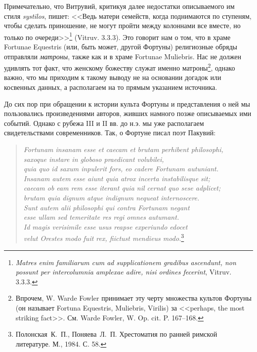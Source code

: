 
Примечательно, что Витрувий, критикуя далее недостатки описываемого им стиля \textit{systilos}, пишет: <<Ведь матери семейств, когда поднимаются по ступеням, чтобы сделать приношение, не могут пройти между колоннами все вместе, но только по очереди>>\footnote{\textit{Matres enim familiarum cum ad supplicationem gradibus ascendunt, non possunt per intercolumnia amplexae adire, nisi ordines fecerint}, Vitruv. 3.3.3.} (Vitruv. 3.3.3). Это говорит нам о том, что в храме Fortunae Equestris (или, быть может, другой Фортуны) религиозные обряды отправляли \textit{матроны}, также как и в храме Fortunae Muliebris. Нас не должен удивлять тот факт, что женскому божеству служат именно матроны\footnote{Впрочем, W. Warde Fowler принимает эту черту множества культов Фортуны (он называет Fortuna Equestris, Muliebris, Virilis) за <<perhaps, the most striking fact>>. См. Warde Fowler, W. Op. cit. P. 167--168.}, однако важно, что мы приходим к такому выводу не на основании догадок или косвенных данных, а располагаем на то прямым указанием источника.


До сих пор при обращении к истории культа Фортуны и представления о ней мы пользовались произведениями авторов, живших намного позже описываемых ими событий. Однако с рубежа III и II вв. до н.э. мы уже располагаем свидетельствами современников. Так, о Фортуне писал поэт Пакувий:

\begin{verse}
\textit{Fortunam insanam esse et caecam et brutam perhibent philosophi,\\
saxoque instare in globoso praedicant volubilei,\\
quia quo id saxum inpulerit fors, eo cadere Fortunam autuniant.\\
Insanam autem esse aiunt quia atrox incerta instabilisque sit;\\
caecam ob eam rem esse iterant quia nil cernat quo sese adplicet;\\
brutam quia dignum atque indignum nequeat internoscere.\\
Sunt autem alii philosophi qui contra Fortunam negant\\
esse ullam sed temeritate res regi omnes autumant.\\
Id magis verisimile esse usus reapse experiundo edocet\\
velut Orestes modo fuit rex, fiictust mendieus modo.}\footnote{Полонская~К.~П., Поняева~Л.~П. Хрестоматия по ранней римской литературе. М., 1984. С. 58.}
\end{verse}

